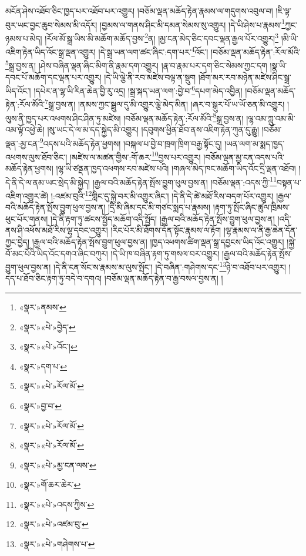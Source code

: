 མངོན་ཤེས་འཐོབ་ཅིང་ཁྱད་པར་འཐོབ་པར་འགྱུར། །བཅོམ་ལྡན་མཆོད་རྟེན་རྣམས་ལ་གདུགས་འབུལ་བ། །ཇི་ལྟ་བུར་ཡང་བྱང་ཆུབ་སེམས་མི་འདོར། །བྱམས་ལ་གནས་ཤིང་མི་དམན་སེམས་སུ་འགྱུར། །དེ་ཡི་ཤེས་པ་རྣམས་\footnote{«སྣར་»ནམས་}ཀྱང་ཉམས་པ་མེད། །རོལ་མོ་སྒྲ་ཡིས་མི་མཆོག་མཆོད་བྱས་\footnote{«སྣར་»«པེ་»བྱེད་}ན། །མྱ་ངན་མེད་ཅིང་དབང་ལྡན་རྒྱལ་པོར་འགྱུར།\footnote{«སྣར་»«པེ་»འོང་།} །མི་ཡི་འཇིག་རྟེན་ཡིད་འོང་སྒྲ་ལྡན་འགྱུར། །དེ་སྒྲ་ཡན་ལག་ཚང་ཞིང་:དག་པར་\footnote{«སྣར་»དག་པ་}འོང་། །བཅོམ་ལྡན་མཆོད་རྟེན་:རོལ་མོའི་\footnote{«སྣར་»«པེ་»རོལ་མོ་}སྒྲ་བྱས་ན། །ཤེས་བཞིན་ལྡན་ཞིང་མིག་ནི་རྣམ་དག་འགྱུར། །རྣ་བ་རྣམ་པར་དག་ཅིང་སེམས་ཀྱང་དག །སྣ་ཡི་དབང་པོ་མཆོག་དང་ལྡན་པར་འགྱུར། །དེ་ཡི་ལྕེ་ནི་རབ་མཛེས་བལྟ་ན་སྡུག །ཐོག་མར་རབ་མཉེན་མཛེས་ཤིང་སྒྲ་ཡིད་འོང་། །དཔེར་ན་ལྷ་ཡི་རིན་ཆེན་བྱི་རུ་འདྲ། །སྒྲ་སྐད་ཡན་ལག་:བྱེ་བ་\footnote{«སྣར་»བྱ་བ་}དཔག་མེད་འབྱིན། །བཅོམ་ལྡན་མཆོད་རྟེན་:རོལ་མོའི་\footnote{«སྣར་»«པེ་»རོལ་མོ་}སྒྲ་བྱས་ན། །ནམས་ཀྱང་སྦྲུལ་དུ་མི་འགྱུར་ལྕེ་མེད་མིན། །ཞར་བ་སྒུར་པོ་ཡ་ཡོ་ཅན་མི་འགྱུར། །ལུས་ནི་ཁྱད་པར་འཕགས་ཤིང་ཤིན་ཏུ་མཛེས། །བཅོམ་ལྡན་མཆོད་རྟེན་:རོལ་མོའི་\footnote{«སྣར་»«པེ་»རོལ་མོ་}སྒྲ་བྱས་ན། །ལྷ་འམ་ཀླུ་འམ་མི་འམ་ལྟོ་འཕྱེ་ཆེ། །སུ་ཡང་དེ་ལ་མ་དད་སྐྱེད་མི་འགྱུར། །དབུགས་ཕྱིན་ཐོབ་ནས་འཇིག་རྟེན་ཀུན་དུ་རྒྱུ། །བཅོམ་ལྡན་:མྱ་ངན་\footnote{«སྣར་»«པེ་»མྱ་ངན་ལས་}འདས་པའི་མཆོད་རྟེན་ཕྱགས། །བསྐལ་པ་བྱེ་བ་ཁྲག་ཁྲིག་བརྒྱ་སྟོང་དུ། །ཡན་ལག་མ་སྨད་ཁྱད་འཕགས་ལུས་ཐོབ་ཅིང་། །མཛེས་ལ་མཚན་གྱིས་:གོ་ཆར་\footnote{«སྣར་»གོ་ཆར་ཆེར་}བྱས་པར་འགྱུར། །བཅོམ་ལྡན་མྱ་ངན་འདས་པའི་མཆོད་རྟེན་ཕྱགས། །ལྷ་ཡི་ཙནྡན་ཁྱད་འཕགས་རབ་མཛེས་པའི། །གཞལ་མེད་ཁང་མཆོག་ཡིད་འོང་དྲི་ལྡན་འཐོབ། །དེ་ནི་དེ་ལ་ནམ་ཡང་སྲེད་མི་སྐྱེད། །རྒྱལ་བའི་མཆོད་རྟེན་སྤོས་བྱུག་ཕུལ་བྱས་ན། །བཅོམ་ལྡན་:འདས་ཀྱི་\footnote{«སྣར་»«པེ་»འདས་ཀྱིས་}བསྟན་པ་འཇིག་འགྱུར་ཚེ། །:འཛམ་བུའི་\footnote{«སྣར་»«པེ་»འཛམ་བུ་}གླིང་དུ་སྐྱེ་བར་མི་འགྱུར་ཞིང་། །དེ་ནི་དེ་ཚེ་མཐོ་རིས་བདག་པོར་འགྱུར། །རྒྱལ་བའི་མཆོད་རྟེན་སྤོས་བྱུག་ཕུལ་བྱས་ན། །དྲི་མི་ཞིམ་དང་མི་གཙང་སྨད་པ་རྣམས། །རྟག་ཏུ་སྤོང་ཞིང་ཚུལ་ཁྲིམས་ཕུང་པོར་གནས། །དེ་ནི་རྟག་ཏུ་ཚངས་སྤྱོད་མཆོག་འདི་སྤྱོད། །རྒྱལ་བའི་མཆོད་རྟེན་སྤོས་བྱུག་ཕུལ་བྱས་ན། །འདི་ནས་ཤི་འཕོས་མཐོ་རིས་ལྷ་དབང་འགྱུར། །རིང་པོར་མི་ཐོགས་དོན་སྟོང་རྣམས་ལ་རྟོག །ལྷ་རྣམས་ལ་ནི་རྒྱ་ཆེན་དོན་ཀྱང་བྱེད། །རྒྱལ་བའི་མཆོད་རྟེན་སྤོས་བྱུག་ཕུལ་བྱས་ན། །ཁྱད་འཕགས་ཚིག་ལྡན་སྒྲ་དབྱངས་ཡིད་འོང་འགྱུར། །སྐྱེ་བོ་མང་པོའི་ཡིད་འོང་དགའ་ཞིང་བཀུར། །དེ་ཡི་ཁ་བཞིན་རྟག་ཏུ་གསལ་བར་འགྱུར། །རྒྱལ་བའི་མཆོད་རྟེན་སྤོས་བྱུག་ཕུལ་བྱས་ན། །དེ་ནི་ངན་སོང་ས་རྣམས་མ་ལུས་སྤོང་། །དེ་བཞིན་:གཤེགས་དང་\footnote{«སྣར་»«པེ་»གཤེགས་པ་}ཉེ་བ་འཐོབ་པར་འགྱུར། །དད་པ་ཐོབ་ཅིང་རྟག་ཏུ་བདེ་བ་དགའ། །བཅོམ་ལྡན་མཆོད་རྟེན་བ་རྒྱ་བསལ་བྱས་ན། །

